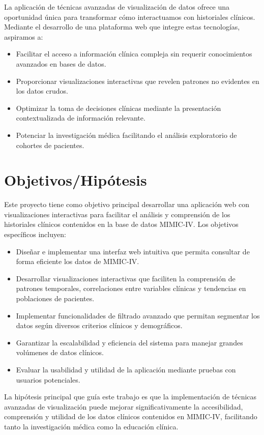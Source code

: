 La aplicación de técnicas avanzadas de visualización de datos ofrece una oportunidad única para transformar cómo interactuamos con historiales clínicos. Mediante el desarrollo de una plataforma web que integre estas tecnologías, aspiramos a:

\begin{itemize}
    \item Facilitar el acceso a información clínica compleja sin requerir conocimientos avanzados en bases de datos.
    \item Proporcionar visualizaciones interactivas que revelen patrones no evidentes en los datos crudos.
    \item Optimizar la toma de decisiones clínicas mediante la presentación contextualizada de información relevante.
    \item Potenciar la investigación médica facilitando el análisis exploratorio de cohortes de pacientes.
\end{itemize}

\section{Objetivos/Hipótesis}

Este proyecto tiene como objetivo principal desarrollar una aplicación web con visualizaciones interactivas para facilitar el análisis y comprensión de los historiales clínicos contenidos en la base de datos MIMIC-IV. Los objetivos específicos incluyen:

\begin{itemize}
    \item Diseñar e implementar una interfaz web intuitiva que permita consultar de forma eficiente los datos de MIMIC-IV.
    \item Desarrollar visualizaciones interactivas que faciliten la comprensión de patrones temporales, correlaciones entre variables clínicas y tendencias en poblaciones de pacientes.
    \item Implementar funcionalidades de filtrado avanzado que permitan segmentar los datos según diversos criterios clínicos y demográficos.
    \item Garantizar la escalabilidad y eficiencia del sistema para manejar grandes volúmenes de datos clínicos.
    \item Evaluar la usabilidad y utilidad de la aplicación mediante pruebas con usuarios potenciales.
\end{itemize}

La hipótesis principal que guía este trabajo es que la implementación de técnicas avanzadas de visualización puede mejorar significativamente la accesibilidad, comprensión y utilidad de los datos clínicos contenidos en MIMIC-IV, facilitando tanto la investigación médica como la educación clínica.

